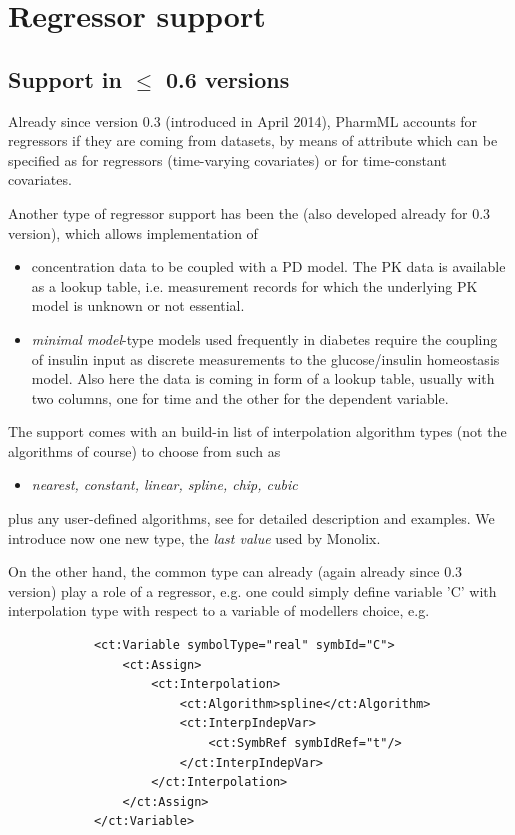 \section{Regressor support}
\label{sec:regressors}

\subsection{Support in $\leq$ 0.6 versions}
Already since version 0.3 (introduced in April 2014), PharmML accounts for 
regressors if they are coming from datasets, by means of  attribute 
which can be specified as  for regressors (time-varying covariates) 
or  for time-constant covariates. 
 
Another type of regressor support has been the  (also developed 
already for 0.3 version), which allows implementation of
\begin{itemize}
\item 
concentration data to be coupled with a PD model. The PK data is 
available as a lookup table, i.e. measurement records for which the underlying 
PK model is unknown or not essential.
\item
\emph{minimal model}-type models used frequently in diabetes require the coupling
of insulin input as discrete measurements to the glucose/insulin homeostasis model. 
Also here the data is coming in form of a lookup table, usually with two columns, one for 
time and the other for the dependent variable.
\end{itemize}
The support comes with an build-in list of interpolation algorithm types (not the algorithms 
of course) to choose from such as
\begin{itemize}
\item 
\emph{nearest, constant, linear, spline, chip, cubic}
\end{itemize}
plus any user-defined algorithms, see \cite{Swat:2014aa} for detailed description
and examples. We introduce now one new type, the \emph{last value} used by Monolix.


On the other hand, the common  type can already (again already since 
0.3 version) play a role of a regressor, e.g. one could simply define variable 'C'
with interpolation type with respect to a variable of modellers choice, e.g.
\lstset{language=XML}
\begin{lstlisting}
            <ct:Variable symbolType="real" symbId="C">
                <ct:Assign>
                    <ct:Interpolation>
                        <ct:Algorithm>spline</ct:Algorithm>
                        <ct:InterpIndepVar>
                            <ct:SymbRef symbIdRef="t"/>
                        </ct:InterpIndepVar>
                    </ct:Interpolation>
                </ct:Assign>
            </ct:Variable>
\end{lstlisting}

